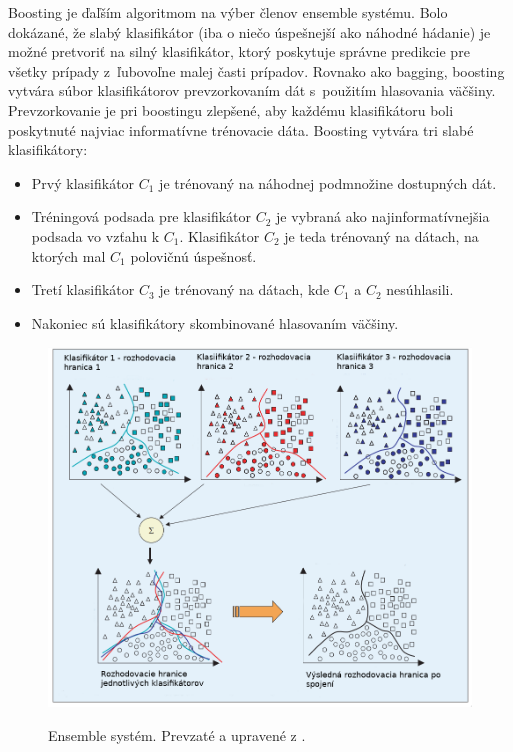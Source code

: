 Boosting \cite{boosting} je ďaľším algoritmom na výber členov ensemble systému. Bolo dokázané, že slabý klasifikátor (iba o niečo úspešnejší ako náhodné hádanie) je možné pretvoriť na silný klasifikátor, ktorý poskytuje správne predikcie pre všetky prípady z~ľubovoľne malej časti prípadov. Rovnako ako bagging, boosting vytvára súbor klasifikátorov prevzorkovaním dát s~použitím hlasovania väčšiny. Prevzorkovanie je pri boostingu zlepšené, aby každému klasifikátoru boli poskytnuté najviac informatívne trénovacie dáta. Boosting vytvára tri slabé klasifikátory:
\begin{itemize}
	\item Prvý klasifikátor $C_{1}$ je trénovaný na náhodnej podmnožine dostupných dát.
	\item Tréningová podsada pre klasifikátor $C_{2}$ je vybraná ako najinformatívnejšia podsada vo vzťahu k $C_{1}$. Klasifikátor $C_{2}$ je teda trénovaný na dátach, na ktorých mal $C_{1}$ polovičnú úspešnosť. 
	\item Tretí klasifikátor $C_{3}$ je trénovaný na dátach, kde $C_{1}$ a $C_{2}$ nesúhlasili.
	\item Nakoniec sú klasifikátory skombinované hlasovaním väčšiny.
\end{itemize}

\begin{figure}[H]
	\centering
	\begin{center}
		\scalebox{0.4}
		{   
			\includegraphics{ensemble.png}
		}
		\caption[ensemble]{Ensemble systém. Prevzaté a upravené z \cite{polikar}.}
		\label{ensemble}	
\end{center}
\end{figure}

